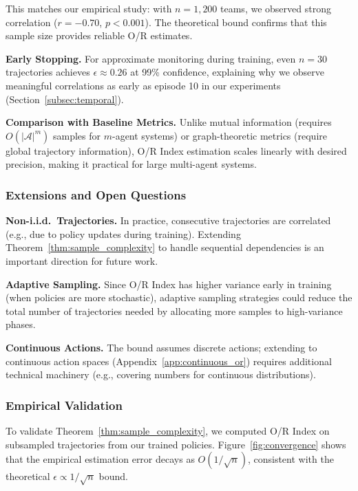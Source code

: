 This matches our empirical study: with $n = 1{,}200$ teams, we observed strong correlation ($r = -0.70$, $p < 0.001$). The theoretical bound confirms that this sample size provides reliable O/R estimates.

\textbf{Early Stopping.} For approximate monitoring during training, even $n = 30$ trajectories achieves $\epsilon \approx 0.26$ at 99\% confidence, explaining why we observe meaningful correlations as early as episode 10 in our experiments (Section~\ref{subsec:temporal}).

\textbf{Comparison with Baseline Metrics.} Unlike mutual information (requires $O(|\mathcal{A}|^m)$ samples for $m$-agent systems) or graph-theoretic metrics (require global trajectory information), O/R Index estimation scales linearly with desired precision, making it practical for large multi-agent systems.

\subsubsection{Extensions and Open Questions}

\textbf{Non-i.i.d.\ Trajectories.} In practice, consecutive trajectories are correlated (e.g., due to policy updates during training). Extending Theorem~\ref{thm:sample_complexity} to handle sequential dependencies is an important direction for future work.

\textbf{Adaptive Sampling.} Since O/R Index has higher variance early in training (when policies are more stochastic), adaptive sampling strategies could reduce the total number of trajectories needed by allocating more samples to high-variance phases.

\textbf{Continuous Actions.} The bound assumes discrete actions; extending to continuous action spaces (Appendix~\ref{app:continuous_or}) requires additional technical machinery (e.g., covering numbers for continuous distributions).

\subsubsection{Empirical Validation}

To validate Theorem~\ref{thm:sample_complexity}, we computed O/R Index on subsampled trajectories from our trained policies. Figure~\ref{fig:convergence} shows that the empirical estimation error decays as $O(1/\sqrt{n})$, consistent with the theoretical $\epsilon \propto 1/\sqrt{n}$ bound.

